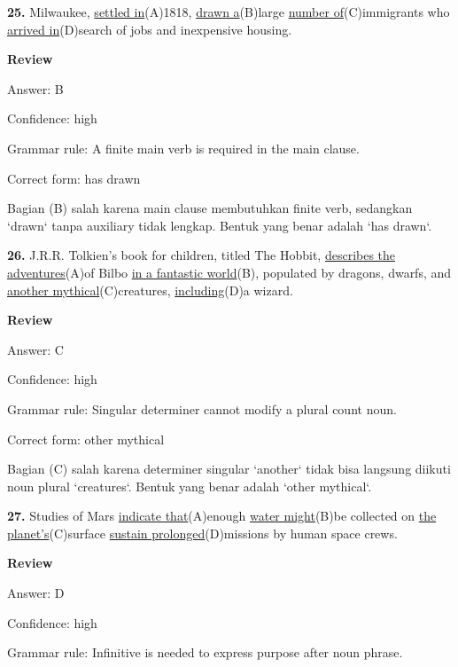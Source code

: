 \documentclass[12pt]{article}
\begin{document}
\noindent\textbf{25.} Milwaukee, \uline{settled in}(A)1818, \uline{drawn a}(B)large \uline{number of}(C)immigrants who \uline{arrived in}(D)search of jobs and inexpensive housing.
\par
\begingroup
\setlength{\parskip}{0pt}
\setlength{\parindent}{0pt}
\textbf{Review}\par
Answer: B\par
Confidence: high\par
Grammar rule: A finite main verb is required in the main clause.\par
Correct form: has drawn\par
Bagian (B) salah karena main clause membutuhkan finite verb, sedangkan `drawn` tanpa auxiliary tidak lengkap. Bentuk yang benar adalah `has drawn`.\par
\endgroup
\par
\vspace{\questionblockgap}
\noindent\textbf{26.} J.R.R. Tolkien's book for children, titled The Hobbit, \uline{describes the adventures}(A)of Bilbo \uline{in a fantastic world}(B), populated by dragons, dwarfs, and \uline{another mythical}(C)creatures, \uline{including}(D)a wizard.
\par
\begingroup
\setlength{\parskip}{0pt}
\setlength{\parindent}{0pt}
\textbf{Review}\par
Answer: C\par
Confidence: high\par
Grammar rule: Singular determiner cannot modify a plural count noun.\par
Correct form: other mythical\par
Bagian (C) salah karena determiner singular `another` tidak bisa langsung diikuti noun plural `creatures`. Bentuk yang benar adalah `other mythical`.\par
\endgroup
\par
\vspace{\questionblockgap}
\noindent\textbf{27.} Studies of Mars \uline{indicate that}(A)enough \uline{water might}(B)be collected on \uline{the planet's}(C)surface \uline{sustain prolonged}(D)missions by human space crews.
\par
\begingroup
\setlength{\parskip}{0pt}
\setlength{\parindent}{0pt}
\textbf{Review}\par
Answer: D\par
Confidence: high\par
Grammar rule: Infinitive is needed to express purpose after noun phrase.\par
\end{document}
